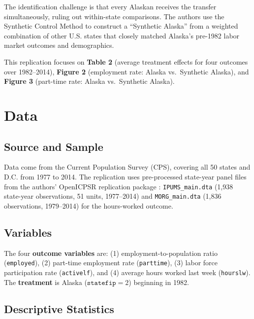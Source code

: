 \documentclass[12pt]{article}
\begin{document}
The identification challenge is that every Alaskan receives the transfer simultaneously, ruling out within-state comparisons. The authors use the Synthetic Control Method \citep{abadie2010synthetic} to construct a ``Synthetic Alaska'' from a weighted combination of other U.S. states that closely matched Alaska's pre-1982 labor market outcomes and demographics.

This replication focuses on \textbf{Table 2} (average treatment effects for four outcomes over 1982--2014), \textbf{Figure 2} (employment rate: Alaska vs.\ Synthetic Alaska), and \textbf{Figure 3} (part-time rate: Alaska vs.\ Synthetic Alaska).

\section{Data}

\subsection{Source and Sample}

Data come from the Current Population Survey (CPS), covering all 50 states and D.C. from 1977 to 2014. The replication uses pre-processed state-year panel files from the authors' OpenICPSR replication package \citep{jones2022labor}: \texttt{IPUMS\_main.dta} (1,938 state-year observations, 51 units, 1977--2014) and \texttt{MORG\_main.dta} (1,836 observations, 1979--2014) for the hours-worked outcome.

\subsection{Variables}

The four \textbf{outcome variables} are: (1) employment-to-population ratio (\texttt{employed}), (2) part-time employment rate (\texttt{parttime}), (3) labor force participation rate (\texttt{activelf}), and (4) average hours worked last week (\texttt{hourslw}). The \textbf{treatment} is Alaska ($\texttt{statefip} = 2$) beginning in 1982.

\subsection{Descriptive Statistics}
\end{document}
